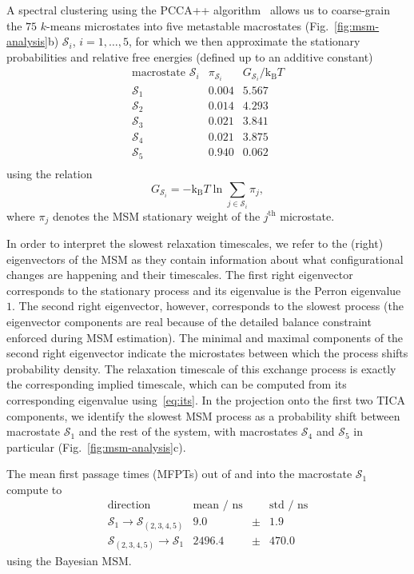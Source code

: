 \documentclass[9pt,tutorial]{livecoms}
\begin{document}
A spectral clustering using the PCCA++ algorithm~\cite{pcca++,Deuflhard2005-pcca,Kube2007-pcca+} allows us to coarse-grain the $75$ $k$-means microstates into five metastable macrostates (Fig.~\ref{fig:msm-analysis}b) $\mathcal{S}_i$, $i=1,\dots,5$, for which we then approximate the stationary probabilities and relative free energies (defined up to an additive constant)
\[ \begin{array}{ccc}
\textrm{macrostate } \mathcal{S}_i & \pi_{\mathcal{S}_i} & G_{\mathcal{S}_i} / \textrm{k}_\textrm{B} T \\
\hline
\mathcal{S}_1 & 0.004 & 5.567 \\
\mathcal{S}_2 & 0.014 & 4.293 \\
\mathcal{S}_3 & 0.021 & 3.841 \\
\mathcal{S}_4 & 0.021 & 3.875 \\
\mathcal{S}_5 & 0.940 & 0.062 \\
\end{array}\]
using the relation
\begin{equation}
\label{eq:fe}
G_{\mathcal{S}_i} = - \textrm{k}_\textrm{B} T \ln \sum\limits_{j\in \mathcal{S}_i} \pi_j,
\end{equation}
where $\pi_j$ denotes the MSM stationary weight of the $j^\textrm{th}$ microstate.

In order to interpret the slowest relaxation timescales, we refer to the (right) eigenvectors of the MSM as they contain information about what configurational changes are happening and their timescales.
The first right eigenvector corresponds to the stationary process and its eigenvalue is the Perron eigenvalue $1$.
The second right eigenvector, however, corresponds to the slowest process 
(the eigenvector components are real because of the detailed balance constraint enforced during MSM estimation).
The minimal and maximal components of the second right eigenvector indicate the microstates between which the process shifts probability density.
The relaxation timescale of this exchange process is exactly the corresponding implied timescale, which can be computed from its corresponding eigenvalue using~\eqref{eq:its}.
In the projection onto the first two TICA components, we identify the slowest MSM process as a probability shift between macrostate $\mathcal{S}_1$ and the rest of the system, with macrostates $\mathcal{S}_4$ and $\mathcal{S}_5$ in particular (Fig.~\ref{fig:msm-analysis}c).

The mean first passage times (MFPTs) out of and into the macrostate $\mathcal{S}_1$ compute to
\[ \begin{array}{crcr}
\textrm{direction} & \textrm{mean / ns} && \textrm{std / ns} \\
\hline
\mathcal{S}_1 \to \mathcal{S}_{(2,3,4,5)} & 9.0 & \pm & 1.9 \\
\mathcal{S}_{(2,3,4,5)} \to \mathcal{S}_1 & 2496.4 & \pm &  470.0
\end{array}\]
using the Bayesian MSM.
\end{document}
